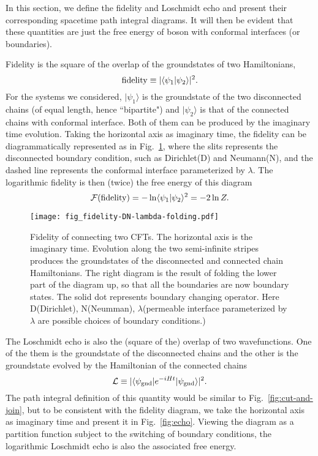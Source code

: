 
In this section, we define the fidelity and Loschmidt echo and present their corresponding spacetime path integral diagrams. It will then be evident that these quantities are just the free energy of boson with conformal interfaces (or boundaries). 

Fidelity is the square of the overlap of the groundstates of two Hamiltonians, 
\begin{equation}
{\rm fidelity} \equiv |\langle \psi_1 |\psi_2  \rangle |^2 .
\end{equation}
For the systems we considered, $|\psi_1 \rangle$ is the groundstate of the two disconnected chains (of equal length, hence ``bipartite") and $|\psi_2\rangle$ is that of the connected chains with conformal interface. Both of them can be produced by the imaginary time evolution. Taking the horizontal axis as imaginary time, the fidelity can be diagrammatically represented as in Fig.~\ref{fig:fidel}, where the slits represents the disconnected boundary condition, such as Dirichlet(D) and Neumann(N), and the dashed line represents the conformal interface parameterized by $\lambda$. The logarithmic fidelity is then (twice) the free energy of this diagram
\begin{equation}
\mathcal{F}( {\rm fidelity} )  = - \ln \langle \psi_1 |\psi_2 \rangle^2 = - 2 \ln Z.
\end{equation}

\begin{figure}[h]
\texttt{[image: fig\_fidelity-DN-lambda-folding.pdf]}
\caption{Fidelity of connecting two CFTs. The horizontal axis is the imaginary time. Evolution along the two semi-infinite stripes produces the groundstates of the disconnected and connected chain Hamiltonians. The right diagram is the result of folding the lower part of the diagram up, so that all the boundaries are now boundary states. The solid dot represents boundary changing operator. Here D(Dirichlet), N(Neumman), $\lambda$(permeable interface parameterized by $\lambda$ are possible choices of boundary conditions.)}
\label{fig:fidel}
\end{figure}

The Loschmidt echo is also the (square of the) overlap of two wavefunctions. One of the them is the groundstate of the disconnected chains and the other is the groundstate evolved by the Hamiltonian of the connected chains
\begin{equation}
\mathcal{L} \equiv |\langle \psi_{\rm gnd}  | e^{-i H t } | \psi_{\rm gnd} \rangle|^2 .
\end{equation}
The path integral definition of this quantity would be similar to Fig.~\ref{fig:cut-and-join}, but to be consistent with the fidelity diagram, we take the horizontal axis as imaginary time and present it in Fig.~\ref{fig:echo}. Viewing the diagram as a partition function subject to the switching of boundary conditions, the logarithmic Loschmidt echo is also the associated free energy.

